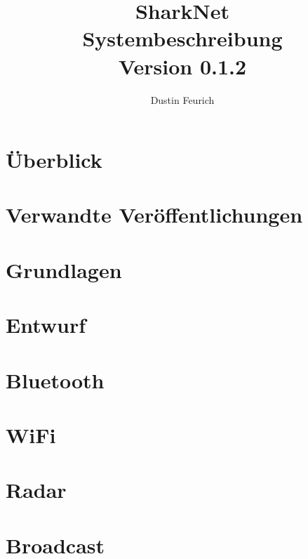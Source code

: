 \documentclass[german, 12pt]{book}
\begin{document}
	
\onehalfspacing

\title{SharkNet\\
Systembeschreibung \\
Version 0.1.2
}

\author{
Dustin Feurich
}

\maketitle

\tableofcontents

\chapter{Überblick}


\chapter{Verwandte Veröffentlichungen}


\chapter{Grundlagen}


\chapter{Entwurf}


\chapter{Bluetooth}


\chapter{WiFi}


\chapter{Radar}


\chapter{Broadcast}

\end{document}
